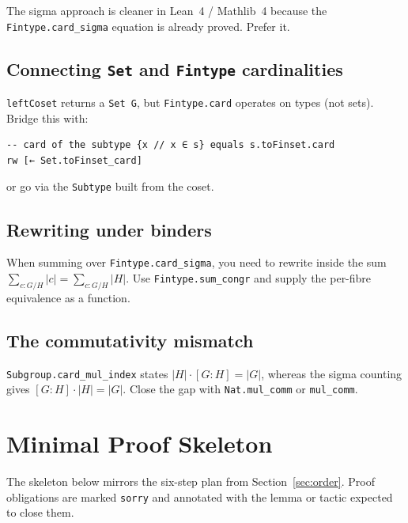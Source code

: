 \documentclass[11pt, a4paper]{article}
\theoremstyle{plain}
\theoremstyle{definition}
\newcommand{\abs}[1]{\lvert #1 \rvert}
\newcommand{\lean}[1]{\texttt{\color{lean-blue}#1}}
\begin{document}
The sigma approach is cleaner in Lean~4 / Mathlib~4 because the
\lean{Fintype.card\_sigma} equation is already proved. Prefer it.

\subsection{Connecting \texttt{Set} and \texttt{Fintype} cardinalities}

\lean{leftCoset} returns a \lean{Set G}, but \lean{Fintype.card} operates
on types (not sets). Bridge this with:

\begin{lstlisting}
-- card of the subtype {x // x ∈ s} equals s.toFinset.card
rw [← Set.toFinset_card]
\end{lstlisting}

or go via the \lean{Subtype} built from the coset.

\subsection{Rewriting under binders}

When summing over \lean{Fintype.card\_sigma}, you need to rewrite inside
the sum
$\sum_{c : G/H} \abs{c} = \sum_{c : G/H} \abs{H}$.
Use \lean{Fintype.sum\_congr} and supply the per-fibre equivalence as a
function.

\subsection{The commutativity mismatch}

\lean{Subgroup.card\_mul\_index} states $\abs{H} \cdot [G:H] = \abs{G}$,
whereas the sigma counting gives $[G:H] \cdot \abs{H} = \abs{G}$.
Close the gap with \lean{Nat.mul\_comm} or \lean{mul\_comm}.

\section{Minimal Proof Skeleton}
\label{sec:skeleton}

The skeleton below mirrors the six-step plan from Section~\ref{sec:order}.
Proof obligations are marked \lean{sorry} and annotated with the lemma or
tactic expected to close them.
\end{document}
